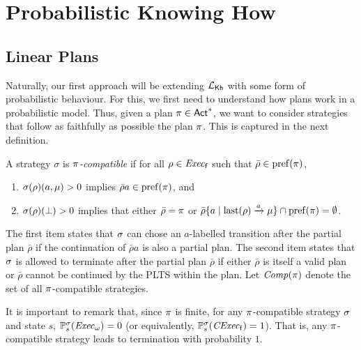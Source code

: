 \section{Probabilistic Knowing How}

\subsection{Linear Plans}

Naturally, our first approach will be extending $\mathcal{L}_{{\mathsf{Kh}}}$ with some
form of probabilistic behaviour.  For this, we first need to
understand how plans work in a probabilistic model.
%
Thus, given a plan $\pi\in{\rm \sf Act}^*$, we want to consider
strategies that follow as faithfully as possible the plan
$\pi$. This is captured in the next definition.

\begin{definition}\label{def:plan:compat}
  A strategy $\sigma$ is \emph{$\pi$-compatible} if for all
  $\rho\in\mathit{Exec}_{\mathsf{f}}$ such that $\bar{\rho}\in\mathrm{pref}(\pi)$,
  \begin{enumerate}
  \item%
    $\sigma(\rho)(a,\mu)>0$ implies $\bar{\rho}a\in\mathrm{pref}(\pi)$, and
  \item%
    $\sigma(\rho)(\bot)>0$ implies that either
    $\bar{\rho}=\pi$ or
    $\bar{\rho}\{a\mid{\mathrm{last}(\rho)\xrightarrow{a}\mu}\}\cap\mathrm{pref}(\pi) = \emptyset$. 
  \end{enumerate}
\end{definition}
%
The first item states that $\sigma$ can chose an $a$-labelled
transition after the partial plan $\bar{\rho}$ if the continuation of
$\bar{\rho}a$ is also a partial plan.
%
The second item states that $\sigma$ is allowed to terminate after the
partial plan $\bar{\rho}$ if either $\bar{\rho}$ is itself a valid
plan or $\bar{\rho}$ cannot be continued by the PLTS within the plan.
%
Let $\mathit{Comp}(\pi)$ denote the set of all $\pi$-compatible
strategies.

It is important to remark that, since $\pi$ is finite, for any
$\pi$-compatible strategy $\sigma$ and state $s$,
$\mathbb{P}^\sigma_s(\mathit{Exec}_\omega)=0$ (or equivalently,
$\mathbb{P}^\sigma_s(\mathit{CExec}_{\mathsf{f}})=1$).  That is, any $\pi$-compatible
strategy leads to termination with probability $1$.


